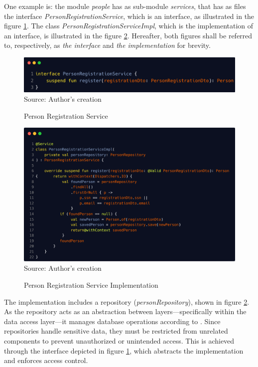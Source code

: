 One example is: the module \textit{people} has as sub-module \textit{services}, that has as files the interface 
\textit{PersonRegistrationService}, which is an interface, as illustrated in the figure \ref{fig:person_registration_service}. The class \textit{PersonRegistrationServiceImpl}, which is the implementation of an interface, is illustrated in the figure \ref{fig:person_registration_service_impl}. Hereafter, both figures shall be referred to, respectively, as \textit{the interface} and \textit{the implementation} for brevity.

\begin{figure}[H]
    \centering
    \caption{Person Registration Service}
     \includegraphics[width=1\linewidth]{figures/person_registration_service.png}
    \label{fig:person_registration_service}
    \footnotesize Source: Author's creation
\end{figure}

\begin{figure}[H]
    \centering
    \caption{Person Registration Service Implementation}
    \includegraphics[width=0.87\linewidth]{figures/person_registration_service_impl.png}
    \label{fig:person_registration_service_impl}
    \\ \footnotesize Source: Author's creation
\end{figure}

The implementation includes a repository (\textit{personRepository}), shown in figure \ref{fig:person_registration_service_impl}. 
As the repository acts as an abstraction between layers—specifically within the data access layer—it manages database operations according to \cite{prajapati2019asp}. Since repositories handle sensitive data, they must be restricted from unrelated components to prevent unauthorized or 
unintended access. This is achieved through the interface depicted in figure \ref{fig:person_registration_service}, which abstracts the implementation and enforces access control.

